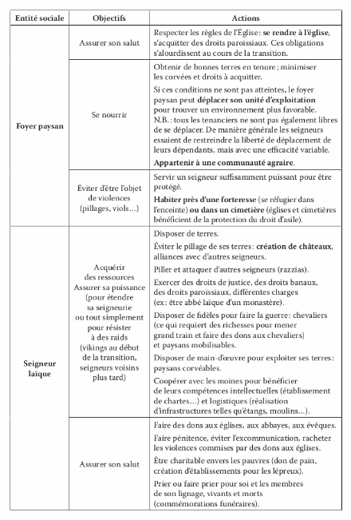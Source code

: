\documentclass[12pt, a4paper, oneside]{book}
\begin{document}
	\begin{figure}[H]
		\centering
		\includegraphics[width=1\linewidth]{src/Chapitre_TMD/Tab1_1.png}
	\end{figure}
\end{document}
